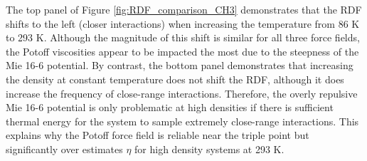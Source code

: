\documentclass[preprint,review,12pt]{elsarticle}
\begin{document}
	The top panel of Figure \ref{fig:RDF_comparison_CH3} demonstrates that the RDF shifts to the left (closer interactions) when increasing the temperature from 86 K to 293 K. Although the magnitude of this shift is similar for all three force fields, the Potoff viscosities appear to be impacted the most due to the steepness of the Mie 16-6 potential. By contrast, the bottom panel demonstrates that increasing the density at constant temperature does not shift the RDF, although it does increase the frequency of close-range interactions. Therefore, the overly repulsive Mie 16-6 potential is only problematic at high densities if there is sufficient thermal energy for the system to sample extremely close-range interactions. This explains why the Potoff force field is reliable near the triple point but significantly over estimates $\eta$ for high density systems at 293 K.
	
	
	
	
\end{document}
